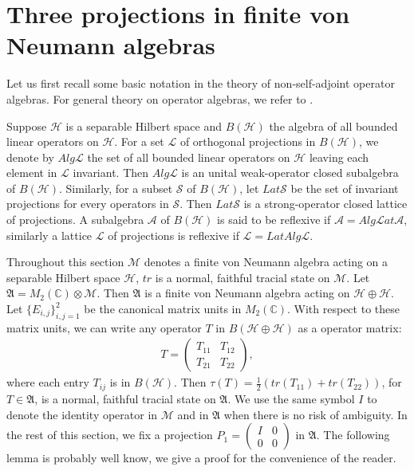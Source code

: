 \documentclass[12pt]{article}
\newcommand{\AAA}{\mathfrak A}
\newcommand{\HHH}{\mathcal H} %
\newcommand{\LLL}{\mathcal L} %
\newcommand{\MMM}{\mathcal M}
\newcommand{\Lat}{\mathcal Lat}
\newcommand{\C}{\mathbb C} %
\def\Lat{{\mathcal Lat}}
\begin{document}
{\section{Three projections in finite von Neumann algebras}

Let us first recall some basic notation in the theory of non-self-adjoint operator
algebras. For general theory on operator algebras, we refer to \cite{KR, RR}.

Suppose $\HHH$ is a separable Hilbert space and $B(\HHH)$ the
algebra of all bounded linear operators on $\HHH$. For a set $\LLL$
of orthogonal projections in $B(\HHH)$, we denote by $Alg\LLL$ the
set of all bounded linear operators on $\HHH$ leaving each element
in $\LLL$ invariant. Then $Alg\LLL$ is an unital weak-operator closed
subalgebra of $B(\HHH)$. Similarly, for a subset $\mathcal{S}$ of
$B(\HHH)$, let $Lat\mathcal{S}$ be the set of  invariant
projections for every operators in $\mathcal{S}$. Then $Lat\mathcal{S}$ is a
strong-operator closed lattice of projections. A subalgebra
$\mathcal{A}$ of $B(\HHH)$ is said to be reflexive if
$\mathcal{A}=Alg\Lat\mathcal{A}$, similarly a lattice $\LLL$ of
projections is reflexive if $\LLL=LatAlg\LLL$.

Throughout this section $\MMM$ denotes a finite von Neumann algebra acting on 
a separable Hilbert space $\HHH$, $tr$ is a normal, faithful tracial state on
$\MMM$. Let $\AAA = M_{2}(\C)\otimes\MMM$. Then $\AAA$ is a finite
von Neumann algebra acting on $\HHH\oplus \HHH$. Let $\{ E_{i,j}
\}_{i,j = 1}^{2}$ be the canonical matrix units in $M_2(\C)$. With
respect to these matrix units, we can write any operator $T$ in
$B(\HHH\oplus \HHH)$ as a operator matrix:
\begin{align*}
T=\left(\begin{array}{cc}T_{11} & T_{12} \\T_{21} &
T_{22}\end{array}\right),
\end{align*}
where each entry $T_{ij}$ is in $B(\HHH)$. Then
$\tau(T)=\frac{1}{2}(tr(T_{11}) + tr(T_{22}))$, for $T\in \AAA$, is
a normal, faithful tracial state on $\AAA$. We use
the same symbol $I$ to denote the identity operator in $\MMM$ and in
$\AAA$  when there is no risk of ambiguity.
In the rest of this section, we fix a projection
$P_1 =\left(\begin{array}{cc}I & 0 \\0 & 0\end{array}\right)$ in
$\AAA$. The following lemma is probably well know, we give a proof for the convenience of the reader.


}
\end{document}
